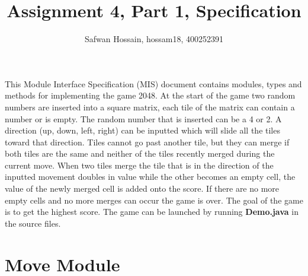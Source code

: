 \documentclass[12pt]{article}
\title{Assignment 4, Part 1, Specification}
\author{Safwan Hossain, hossam18, 400252391}
\newcommand{\authornote}[3]{\textcolor{#1}{[#3 ---#2]}}
\newcommand{\authornote}[3]{}
\newcommand{\wss}[1]{\authornote{blue}{SS}{#1}}
\begin{document}
\maketitle
This Module Interface Specification (MIS) document contains modules, types and
methods for implementing the game 2048. At the start of the game two random numbers are inserted into a square matrix, each tile of the matrix can contain a number or is empty. The random number that is inserted can be a 4 or 2. A direction (up, down, left, right) can be inputted which will slide all the tiles toward that direction. Tiles cannot go past another tile, but they can merge if both tiles are the same and neither of the tiles recently merged during the current move. When two tiles merge the tile that is in the direction of the inputted movement doubles in value while the other becomes an empty cell, the value of the newly merged cell is added onto the score. If there are no more empty cells and no more merges can occur the game is over. The goal of the game is to get the highest score. The game can be launched by running \textbf{Demo.java} in the source files.





% 
% 

\newpage

\section* {Move Module}
\end{document}

